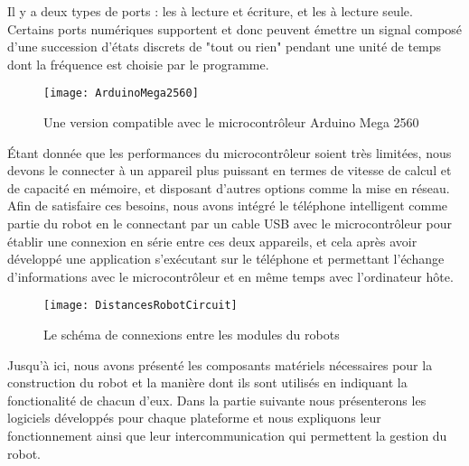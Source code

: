 Il y a deux types de ports : les  à lecture et
écriture, et les  à lecture seule. Certains ports
numériques supportent  et donc peuvent
émettre un signal composé d'une succession d'états discrets de "tout ou rien"
pendant une unité de temps dont la fréquence est choisie par le programme.

\begin{figure}[h]
\begin{center}
\texttt{[image: ArduinoMega2560]}
\caption{Une version compatible avec le microcontrôleur Arduino Mega 2560}{}
\end{center}
\end{figure}

Étant donnée que les performances du microcontrôleur soient très limitées, nous
devons le connecter à un appareil plus puissant en termes de vitesse
de calcul et de capacité en mémoire, et disposant d'autres options comme la
mise en réseau. Afin de satisfaire ces besoins, nous avons intégré le téléphone
intelligent  comme partie du robot en le connectant
par un cable USB avec le microcontrôleur pour établir une connexion en série entre
ces deux appareils, et cela après avoir développé une application s'exécutant
sur le téléphone et permettant l'échange d'informations avec le microcontrôleur
et en même temps avec l'ordinateur hôte.

\begin{figure}[h]
\begin{center}
\texttt{[image: DistancesRobotCircuit]}
\caption{Le schéma de connexions entre les modules du robots}{}
\end{center}
\end{figure}

Jusqu'à ici, nous avons présenté les composants matériels nécessaires pour la
construction du robot et la manière dont ils sont utilisés en indiquant la
fonctionalité de chacun d'eux. Dans la partie suivante nous présenterons les
logiciels développés pour chaque plateforme et nous expliquons leur fonctionnement
ainsi que leur intercommunication qui permettent la gestion du robot.
